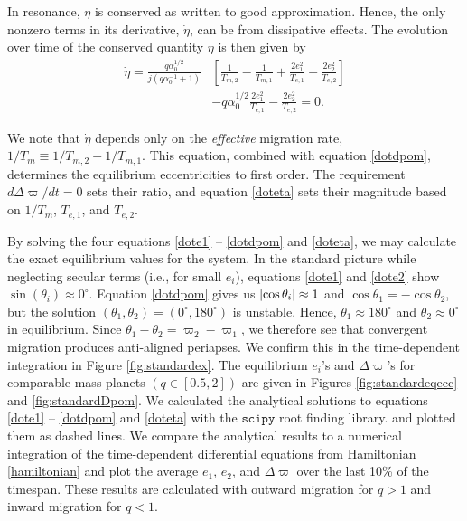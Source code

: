 \documentclass[usenatbib,twocolumn]{mnras}
\DeclarePairedDelimiter{\abs}{|}{|}
\begin{document}
\noindent
In resonance, \(\eta\) is conserved as written to good approximation.
Hence, the only nonzero terms in its derivative, \(\dot{\eta}\),
can be from dissipative effects.
The evolution over time of the conserved quantity \(\eta\) is then given by
\begin{align}
\label{doteta}
  \dot\eta = \frac{q\alpha_0^{1/2}}{j(q\alpha_0^{-1}+1)}&\left[ \frac{1}{T_{m,2}} - \frac{1}{T_{m,1}}
      + \frac{2e_1^2}{T_{e,1}}- \frac{2e_2^2}{T_{e,2}} \right] \nonumber\\
    &- q\alpha_0^{1/2}\frac{2e_1^2}{T_{e,1}} - \frac{2e_2^2}{T_{e,2}}=0.
\end{align}

\noindent We note that \(\dot\eta\) depends only on the
\emph{effective} migration rate, \(1/T_m \equiv 1/T_{m,2} - 1/T_{m,1}\).  This
equation, combined with equation \eqref{dotdpom}, determines the
equilibrium eccentricities to first order. The requirement \(d\Delta\varpi/dt=0\) sets their ratio,
and equation \eqref{doteta} sets their magnitude based on \(1/T_m\), \(T_{e,1}\),
and \(T_{e,2}\).

By solving the four equations \eqref{dote1} -- \eqref{dotdpom} and
\eqref{doteta}, we may calculate the exact equilibrium values for the system.
In the standard picture while neglecting secular terms (i.e., for small
\(e_i\)), equations \eqref{dote1} and \eqref{dote2} show
\(\sin(\theta_i)\approx 0^\circ\).  Equation \eqref{dotdpom} gives us
\(\abs{\cos\theta_i} \approx 1\) and \(\cos\theta_1 = -\cos\theta_2\), but
the solution \((\theta_1,\theta_2)=(0^\circ,180^\circ)\) is unstable.  Hence,
\(\theta_1\approx180^\circ\) and \(\theta_2\approx 0^\circ\) in equilibrium.  Since
\(\theta_1-\theta_2 = \varpi_2-\varpi_1\), we therefore see that
convergent migration produces anti-aligned periapses.  We confirm this
in the time-dependent integration in Figure \ref{fig:standardex}.
The equilibrium \(e_i\)'s and \(\Delta\varpi\)'s for comparable mass
planets \((q\in[0.5,2])\) are given in Figures \ref{fig:standardeqecc} and
\ref{fig:standardDpom}.
We calculated the analytical solutions to equations \eqref{dote1} -- \eqref{dotdpom}
and \eqref{doteta}
with the $\mathtt{scipy}$ root finding library.
and plotted them as dashed lines.
We compare the analytical results to a numerical integration of the 
time-dependent differential equations from Hamiltonian
\eqref{hamiltonian} and plot the average \(e_1\), \(e_2\), and
\(\Delta\varpi\) over the last 10\% of the timespan.  These results are
calculated with outward migration for \(q>1\) and inward migration for
\(q<1\).
\end{document}
